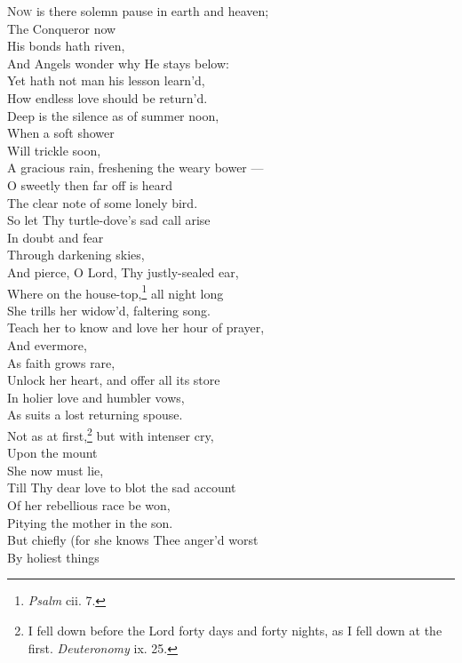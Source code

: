 \textsc{Now} is there solemn pause in earth and heaven; \\
 The Conqueror now \\
 His bonds hath riven, \\
 And Angels wonder why He stays below: \\
 Yet hath not man his lesson learn’d, \\
 How endless love should be return’d. \\
  Deep is the silence as of summer noon, \\
 When a soft shower \\
 Will trickle soon, \\
 A gracious rain, freshening the weary bower — \\
 O sweetly then far off is heard \\
 The clear note of some lonely bird. \\
  So let Thy turtle-dove’s sad call arise \\
 In doubt and fear \\
 Through darkening skies, \\
 And pierce, O Lord, Thy justly-sealed ear, \\
 Where on the house-top,\footnote{\emph{Psalm} cii. 7.} all night long \\
 She trills her widow’d, faltering song. \\
  Teach her to know and love her hour of prayer, \\
 And evermore, \\
 As faith grows rare, \\
 Unlock her heart, and offer all its store \\
 In holier love and humbler vows, \\
 As suits a lost returning spouse. \\
  Not as at first,\footnote{I fell down before the Lord forty days and forty nights, as I fell down at the first. \emph{Deuteronomy} ix. 25.} but with intenser cry, \\
 Upon the mount \\
 She now must lie, \\
 Till Thy dear love to blot the sad account \\
 Of her rebellious race be won, \\
 Pitying the mother in the son. \\
  But chiefly (for she knows Thee anger’d worst \\
 By holiest things \\

